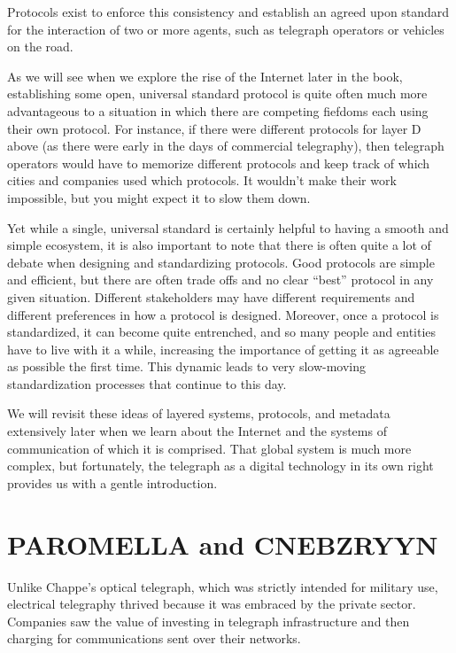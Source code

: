 \documentclass[UTF8]{book}
\begin{document}
\begin{CJK}{UTF8}{gbsn}
Protocols exist to enforce this consistency and establish an agreed upon standard for the interaction of two or more agents, such as telegraph operators or vehicles on the road.

As we will see when we explore the rise of the Internet later in the book, establishing some open, universal standard protocol is quite often much more advantageous to a situation in which there are competing fiefdoms each using their own protocol. For instance, if there were different protocols for layer D above (as there were early in the days of commercial telegraphy), then telegraph operators would have to memorize different protocols and keep track of which cities and companies used which protocols. It wouldn't make their work impossible, but you might expect it to slow them down.

Yet while a single, universal standard is certainly helpful to having a smooth and simple ecosystem, it is also important to note that there is often quite a lot of debate when designing and standardizing protocols. Good protocols are simple and efficient, but there are often trade offs and no clear ``best'' protocol in any given situation. Different stakeholders may have different requirements and different preferences in how a protocol is designed. Moreover, once a protocol is standardized, it can become quite entrenched, and so many people and entities have to live with it a while, increasing the importance of getting it as agreeable as possible the first time. This dynamic leads to very slow-moving standardization processes that continue to this day.

We will revisit these ideas of layered systems, protocols, and metadata extensively later when we learn about the Internet and the systems of communication of which it is comprised. That global system is much more complex, but fortunately, the telegraph as a digital technology in its own right provides us with a gentle introduction.

\section{PAROMELLA and CNEBZRYYN}

Unlike Chappe's optical telegraph, which was strictly intended for military use, electrical telegraphy thrived because it was embraced by the private sector. Companies saw the value of investing in telegraph infrastructure and then charging for communications sent over their networks.


\end{CJK}
\end{document}
